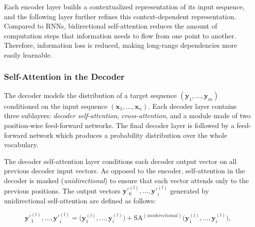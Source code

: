 
Each encoder layer builds a contextualized representation of its input sequence, and the following layer further refines this context-dependent representation. Compared to \acp{RNN}, bidirectional self-attention reduces the amount of computation steps that information needs to flow from one point to another. Therefore, information loss is reduced, making long-range dependencies more easily learnable. 

\subsubsection{Self-Attention in the Decoder} 

The decoder models the distribution of a target sequence $(\bm{y}_1, \ldots, \bm{y}_m)$ conditioned on the input sequence $(\bm{x}_1, \ldots, \bm{x}_n)$. Each decoder layer contains three sublayers: \textit{decoder self-attention}, \textit{cross-attention}, and a module made of two position-wise feed-forward networks. The final decoder layer is followed by a feed-forward network which produces a probability distribution over the whole vocabulary. 

The decoder self-attention layer conditions each decoder output vector on all previous decoder input vectors. As opposed to the encoder, self-attention in the decoder is masked (\textit{unidirectional}) to ensure that each vector attends only to the previous positions. The output vectors $\bm{y}'^{(l)}_0, \ldots, \bm{y}'^{(l)}_i$ generated by unidirectional self-attention are defined as follows:



\begin{equation}
        \bm{y}'^{(l)}_1, \ldots, \bm{y}'^{(l)}_{i} = \bigl(\bm{y}^{(l)}_1, \ldots, \bm{y}^{(l)}_{i}\bigr) + \textrm{SA}^{(unidirectional)}\bigl(\bm{y}^{(l)}_1, \ldots, \bm{y}^{(l)}_{i}\bigr), 
\end{equation}

